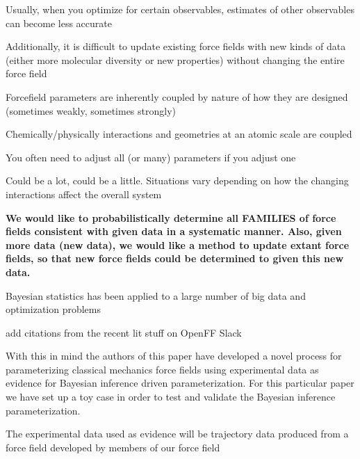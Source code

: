 \documentclass{report}
\begin{document}
\begin{outline}
\begin{outline}
{\begin{outline}
\begin{outline}
        \item{Usually, when you optimize for certain observables, estimates of other observables can become less accurate}
      \end{outline}
      \item{Additionally, it is difficult to update existing force fields with new kinds of data (either more molecular diversity or new properties) without 
            changing the entire force field}
      \begin{outline}
        \item{Forcefield parameters are inherently coupled by nature of how they are designed (sometimes weakly, sometimes strongly)}
        \item{Chemically/physically interactions and geometries at an atomic scale are coupled}
        \item{You often need to adjust all (or many) parameters if you adjust one}
        \item{Could be a lot, could be a little. Situations vary depending on how the changing interactions affect the overall system}
      \end{outline}
      \item{\bf We would like to probabilistically determine all FAMILIES of force fields consistent with given data in a systematic manner. Also, given more 
            data (new data), we would like a method  to update extant force fields, so that new force fields could be determined to given this new data.}
    \end{outline}
    \item{Bayesian statistics has been applied to a large number of big data and optimization problems \cite{bayes1,bayes2,bayes3,bayes4,bayes5,bayes6,bayes7,
          bayes8}}
    \begin{outline}
      \item{add citations from the recent lit stuff on OpenFF Slack}
    \end{outline}
    \item{With this in mind the authors of this paper have developed a novel process for parameterizing classical mechanics force fields using experimental 
          data as evidence for Bayesian inference driven parameterization. For this particular paper we have set up a toy case in order to test and validate 
          the Bayesian inference parameterization.}
    \begin{outline}
      \item{The experimental data used as evidence will be trajectory data produced from a force field developed by members of our force field 
}
\end{outline}}
\end{outline}
\end{outline}
\end{document}
